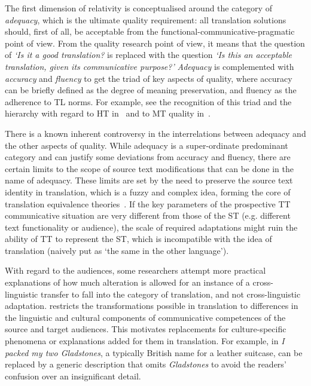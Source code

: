 The first dimension of relativity is conceptualised around the category of \textit{adequacy}, which is the ultimate quality requirement: all translation solutions should, first of all, be acceptable from the functional-communicative-pragmatic point of view. From the quality research point of view, it means that the question of \emph{`Is it a good translation?} is replaced with the question \emph{`Is this an acceptable translation, given its communicative purpose?'}
\textit{Adequacy} is complemented with \textit{accuracy} and \textit{fluency} to get the triad of key aspects of quality, where accuracy can be briefly defined as the degree of meaning preservation, and fluency as the adherence to TL norms. For example, see the recognition of this triad and the hierarchy with regard to HT in~\citet{Chesterman1998} and to MT quality in~\citet{Koponen2010}.

There is a known inherent controversy in the interrelations between adequacy and the other aspects of quality. While adequacy is a super-ordinate predominant category and can justify some deviations from accuracy and fluency, there are certain limits to the scope of source text modifications that can be done in the name of adequacy. These limits are set by the need to preserve the source text identity in translation, which is a fuzzy and complex idea, forming the core of translation equivalence theories~\cite[such as proposed by][]{Nida1964}. 
If the key parameters of the prospective TT communicative situation are very different from those of the ST (e.g. different text functionality or audience), the scale of required adaptations might ruin the ability of TT to represent the ST, which is incompatible with the idea of translation (naively put as `the same in the other language').

With regard to the audiences, some researchers attempt more practical explanations of how much alteration is allowed for an instance of a cross-linguistic transfer to fall into the category of translation, and not cross-linguistic adaptation. \citet{Latyshev2003} restricts the transformations possible in translation to differences in the linguistic and cultural components of communicative competences of the source and target audiences. This motivates replacements for culture-specific phenomena or explanations added for them in translation. For example, in \textit{I packed my two Gladstones}, a typically British name for a leather suitcase, can be replaced by a generic description that omits \textit{Gladstones} to avoid the readers' confusion over an insignificant detail.


